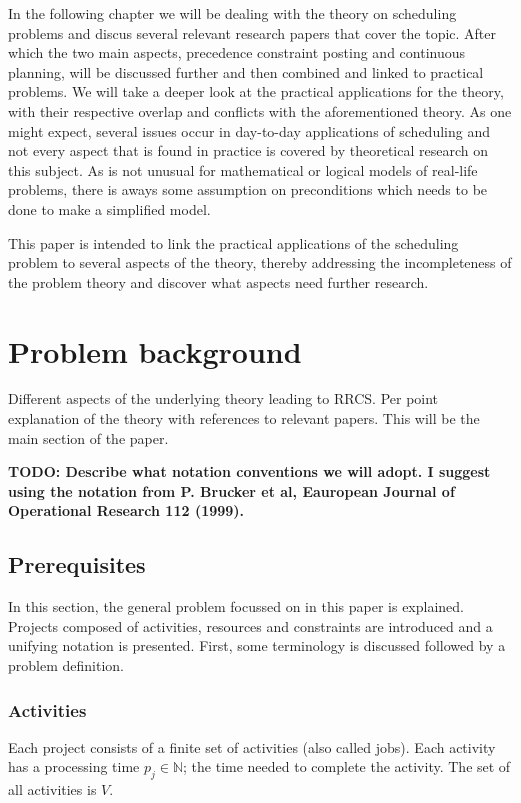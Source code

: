 \documentclass{article}
\newcommand{\TODO}[1]{{\color{red}\textbf{TODO: #1}}}
\begin{document}
In the following chapter we will be dealing with the theory on scheduling problems and discus several relevant research papers that cover the topic.
After which the two main aspects, precedence constraint posting and continuous planning, will be discussed further and then combined and linked to practical problems.
We will take a deeper look at the practical applications for the theory, with their respective overlap and conflicts with the aforementioned theory.
As one might expect, several issues occur in day-to-day applications of scheduling and not every aspect that is found in practice is covered by theoretical research on this subject.
As is not unusual for mathematical or logical models of real-life problems, there is aways some assumption on preconditions which needs to be done to make a simplified model.

This paper is intended to link the practical applications of the scheduling problem to several aspects of the theory, thereby addressing the incompleteness of the problem theory and discover what aspects need further research.


\newpage

\section{Problem background}

Different aspects of the underlying theory leading to RRCS.  Per point explanation of the theory with references to relevant papers. This will be the main section of the paper.

\TODO{Describe what notation conventions we will adopt. I suggest using the notation from P. Brucker et al, Eauropean Journal of Operational Research 112 (1999). }

\subsection{Prerequisites}
In this section, the general problem focussed on in this paper is explained. Projects composed of activities, resources and constraints are introduced and a unifying notation is presented. First, some terminology is discussed followed by a problem definition.

\subsubsection{Activities}
Each project consists of a finite set of activities (also called jobs). Each activity has a processing time $p_{j} \in \mathbb{N}$; the time needed to complete the activity. The set of all activities is $V$.
\end{document}
